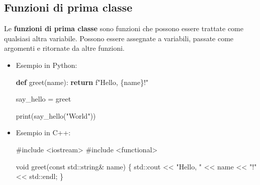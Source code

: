 \documentclass[
  letterpaper,
]{scrbook}
\newenvironment{Shaded}{\begin{snugshade}}{\end{snugshade}}
\newcommand{\AttributeTok}[1]{\textcolor[rgb]{0.40,0.45,0.13}{#1}}
\newcommand{\BuiltInTok}[1]{\textcolor[rgb]{0.00,0.23,0.31}{#1}}
\newcommand{\ControlFlowTok}[1]{\textcolor[rgb]{0.00,0.23,0.31}{\textbf{#1}}}
\newcommand{\DataTypeTok}[1]{\textcolor[rgb]{0.68,0.00,0.00}{#1}}
\newcommand{\ImportTok}[1]{\textcolor[rgb]{0.00,0.46,0.62}{#1}}
\newcommand{\KeywordTok}[1]{\textcolor[rgb]{0.00,0.23,0.31}{\textbf{#1}}}
\newcommand{\NormalTok}[1]{\textcolor[rgb]{0.00,0.23,0.31}{#1}}
\newcommand{\OperatorTok}[1]{\textcolor[rgb]{0.37,0.37,0.37}{#1}}
\newcommand{\PreprocessorTok}[1]{\textcolor[rgb]{0.68,0.00,0.00}{#1}}
\newcommand{\SpecialCharTok}[1]{\textcolor[rgb]{0.37,0.37,0.37}{#1}}
\newcommand{\SpecialStringTok}[1]{\textcolor[rgb]{0.13,0.47,0.30}{#1}}
\newcommand{\StringTok}[1]{\textcolor[rgb]{0.13,0.47,0.30}{#1}}
\providecommand{\tightlist}{%
  \setlength{\itemsep}{0pt}\setlength{\parskip}{0pt}}\usepackage{longtable,booktabs,array}
\newcommand*\circled[1]{\tikz[baseline=(char.base)]{
          \node[shape=circle,draw,inner sep=1pt] (char) {{\scriptsize#1}};}}
\begin{document}
\subsection{Funzioni di prima classe}\label{funzioni-di-prima-classe}

Le \textbf{funzioni di prima classe} sono funzioni che possono essere
trattate come qualsiasi altra variabile. Possono essere assegnate a
variabili, passate come argomenti e ritornate da altre funzioni.

\begin{itemize}
\item
  Esempio in Python:

\label{annotated-cell-120}%
\begin{Shaded}
\begin{Highlighting}[]
\KeywordTok{def}\NormalTok{ greet(name):}
  \ControlFlowTok{return} \SpecialStringTok{f"Hello, }\SpecialCharTok{\{}\NormalTok{name}\SpecialCharTok{\}}\SpecialStringTok{!"}

\NormalTok{say\_hello }\OperatorTok{=}\NormalTok{ greet }\hspace*{\fill}\NormalTok{\circled{1}}

\BuiltInTok{print}\NormalTok{(say\_hello(}\StringTok{"World"}\NormalTok{)) }\hspace*{\fill}\NormalTok{\circled{2}}
\end{Highlighting}
\end{Shaded}

\item
  Esempio in C++:

\label{annotated-cell-121}%
\begin{Shaded}
\begin{Highlighting}[]
\PreprocessorTok{\#include }\ImportTok{\textless{}iostream\textgreater{}}
\PreprocessorTok{\#include }\ImportTok{\textless{}functional\textgreater{}}

\DataTypeTok{void}\NormalTok{ greet}\OperatorTok{(}\AttributeTok{const} \BuiltInTok{std::}\NormalTok{string}\OperatorTok{\&}\NormalTok{ name}\OperatorTok{)} \OperatorTok{\{}
  \BuiltInTok{std::}\NormalTok{cout }\OperatorTok{\textless{}\textless{}} \StringTok{"Hello, "} \OperatorTok{\textless{}\textless{}}\NormalTok{ name }\OperatorTok{\textless{}\textless{}} \StringTok{"!"} \OperatorTok{\textless{}\textless{}} \BuiltInTok{std::}\NormalTok{endl}\OperatorTok{;}
\OperatorTok{\}}


\end{Highlighting}
\end{Shaded}
\end{itemize}
\end{document}
